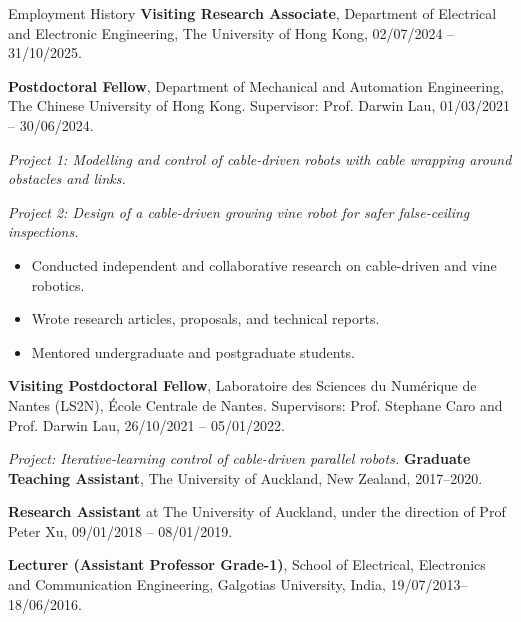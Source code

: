 \begin{rubric}{Employment History}
\entry*[2024 -- 2025]%
	\textbf{Visiting Research Associate}, Department of Electrical and Electronic Engineering, The University of Hong Kong, 02/07/2024 -- 31/10/2025.

\entry*[2021 -- 2024]%
	\textbf{Postdoctoral Fellow}, Department of Mechanical and Automation Engineering, The Chinese University of Hong Kong. Supervisor: Prof. Darwin Lau, 01/03/2021 -- 30/06/2024.
 \par \textit{Project 1: Modelling and control of cable-driven robots with cable wrapping around obstacles and links.}
 \par \textit{Project 2: Design of a cable-driven growing vine robot for safer false-ceiling inspections.}
 \begin{itemize}
    \item Conducted independent and collaborative research on cable-driven and vine robotics.
    \item Wrote research articles, proposals, and technical reports.
    \item Mentored undergraduate and postgraduate students.
 \end{itemize}
 
\entry*[2021 -- 2022]%
    \textbf{Visiting Postdoctoral Fellow}, Laboratoire des Sciences du Numérique de Nantes (LS2N), École Centrale de Nantes. Supervisors: Prof. Stephane Caro and Prof. Darwin Lau, 26/10/2021 -- 05/01/2022.
    \par \textit{Project: Iterative-learning control of cable-driven parallel robots.}
\entry*[2017 -- 2020]%
	\textbf{Graduate Teaching Assistant}, The University of Auckland, New Zealand, 2017--2020.

\entry*[2018 -- 2019]%
	\textbf{Research Assistant} at The University of Auckland, under the direction of Prof Peter Xu, 09/01/2018 -- 08/01/2019.
    
\entry*[2013 -- 2016]%
    \textbf{Lecturer (Assistant Professor Grade-1)}, School of Electrical, Electronics and Communication Engineering, Galgotias University, India, 19/07/2013--18/06/2016.

\end{rubric}